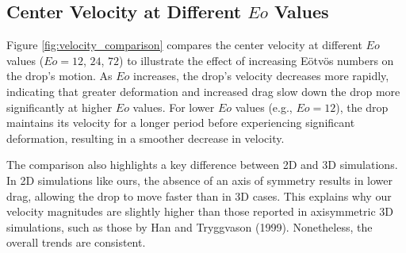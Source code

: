 \documentclass[12pt]{article}
\begin{document}
\subsection{Center Velocity at Different $Eo$ Values}
Figure \ref{fig:velocity_comparison} compares the center velocity at different $Eo$ values ($Eo = 12$, $24$, $72$) to illustrate the effect of increasing Eötvös numbers on the drop’s motion. As $Eo$ increases, the drop's velocity decreases more rapidly, indicating that greater deformation and increased drag slow down the drop more significantly at higher $Eo$ values. For lower $Eo$ values (e.g., $Eo = 12$), the drop maintains its velocity for a longer period before experiencing significant deformation, resulting in a smoother decrease in velocity.

The comparison also highlights a key difference between 2D and 3D simulations. In 2D simulations like ours, the absence of an axis of symmetry results in lower drag, allowing the drop to move faster than in 3D cases. This explains why our velocity magnitudes are slightly higher than those reported in axisymmetric 3D simulations, such as those by Han and Tryggvason (1999). Nonetheless, the overall trends are consistent.
\end{document}
